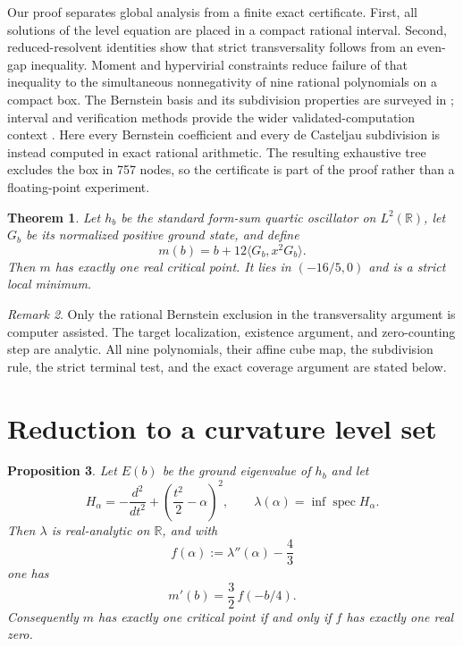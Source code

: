\documentclass[11pt,reqno]{amsart}
\theoremstyle{plain}
\newtheorem{theorem}{Theorem}[section]
\newtheorem{proposition}[theorem]{Proposition}
\theoremstyle{definition}
\theoremstyle{remark}
\newtheorem{remark}[theorem]{Remark}
\numberwithin{equation}{section}
\begin{document}
Our proof separates global analysis from a finite exact certificate.  First,
all solutions of the level equation are placed in a compact rational
interval.  Second, reduced-resolvent identities show that strict
transversality follows from an even-gap inequality.  Moment and hypervirial
constraints reduce failure of that inequality to the simultaneous
nonnegativity of nine rational polynomials on a compact box.  The Bernstein
basis and its subdivision properties are surveyed in
\cite{Farouki_2012tb}; interval and verification methods provide the wider
validated-computation context \cite{Moore_Book,Rump_2010vm}.  Here every
Bernstein coefficient and every de Casteljau subdivision is instead computed
in exact rational arithmetic.  The resulting exhaustive tree excludes the
box in 757 nodes, so the certificate is part of the proof rather than a
floating-point experiment.

\begin{theorem}\label{thm:unique}
Let $h_b$ be the standard form-sum quartic oscillator on $L^2(\mathbb R)$,
let $G_b$ be its normalized positive ground state, and define
\[
m(b)=b+12\langle G_b,x^2G_b\rangle.
\]
Then $m$ has exactly one real critical point.  It lies in
$(-16/5,0)$ and is a strict local minimum.
\end{theorem}

\begin{remark}
Only the rational Bernstein exclusion in the transversality argument is
computer assisted.  The target localization, existence argument, and
zero-counting step are analytic.  All nine polynomials, their affine cube
map, the subdivision rule, the strict terminal test, and the exact coverage
argument are stated below.
\end{remark}

\section{Reduction to a curvature level set}
\label{sec:reduction}

\begin{proposition}
  \label{prop:reduction}
  Let $E(b)$ be the ground eigenvalue of $h_b$ and let
  \begin{equation}
    \label{eq:Halpha}
    H_\alpha=-\frac{d^2}{dt^2}+\left(\frac{t^2}{2}-\alpha\right)^2,
    \qquad
    \lambda(\alpha)=\inf\operatorname{spec}H_\alpha .
  \end{equation}
  Then $\lambda$ is real-analytic on $\mathbb R$, and with
  \begin{equation}
    \label{eq:f}
    f(\alpha):=\lambda''(\alpha)-\frac43
  \end{equation}
  one has
  \begin{equation}
    \label{eq:mprime}
    m'(b)=\frac32\,f(-b/4).
  \end{equation}
  Consequently $m$ has exactly one critical point if and only if $f$ has
  exactly one real zero.
\end{proposition}
\end{document}
